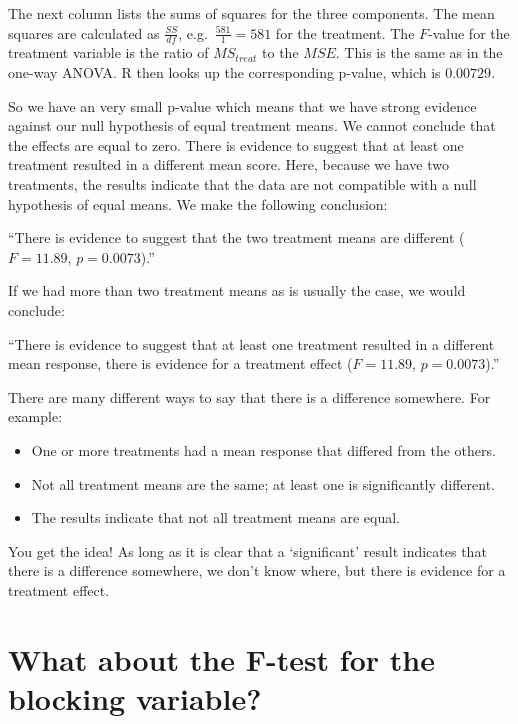 \documentclass[
  letterpaper,
]{book}
\providecommand{\tightlist}{%
  \setlength{\itemsep}{0pt}\setlength{\parskip}{0pt}}\usepackage{longtable,booktabs,array}
\begin{document}
The next column lists the sums of squares for the three components. The
mean squares are calculated as \(\frac{SS}{df}\),
e.g.~\(\frac{581}{1} = 581\) for the treatment. The \(F\)-value for the
treatment variable is the ratio of \(MS_{treat}\) to the \(MSE\). This
is the same as in the one-way ANOVA. R then looks up the corresponding
p-value, which is \(0.00729\).

So we have an very small p-value which means that we have strong
evidence against our null hypothesis of equal treatment means. We cannot
conclude that the effects are equal to zero. There is evidence to
suggest that at least one treatment resulted in a different mean score.
Here, because we have two treatments, the results indicate that the data
are not compatible with a null hypothesis of equal means. We make the
following conclusion:

``There is evidence to suggest that the two treatment means are
different (\(F = 11.89\), \(p = 0.0073\)).''

If we had more than two treatment means as is usually the case, we would
conclude:

``There is evidence to suggest that at least one treatment resulted in a
different mean response, there is evidence for a treatment effect
(\(F = 11.89\), \(p = 0.0073\)).''

There are many different ways to say that there is a difference
somewhere. For example:

\begin{itemize}
\tightlist
\item
  One or more treatments had a mean response that differed from the
  others.
\item
  Not all treatment means are the same; at least one is significantly
  different.
\item
  The results indicate that not all treatment means are equal.
\end{itemize}

You get the idea! As long as it is clear that a `significant' result
indicates that there is a difference somewhere, we don't know where, but
there is evidence for a treatment effect.

\section*{What about the F-test for the blocking
variable?}\label{what-about-the-f-test-for-the-blocking-variable}
\end{document}
